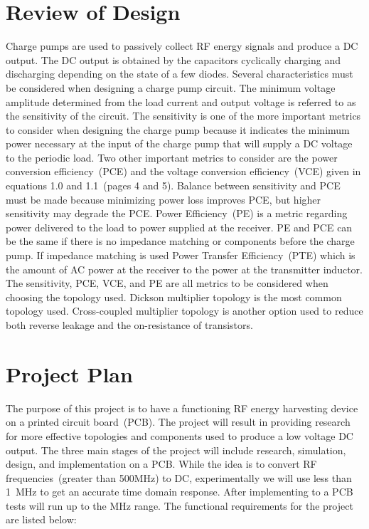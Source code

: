 \documentclass[12pt]{article}
\begin{document}
	\section{Review of Design}
	Charge pumps are used to passively collect RF energy signals and produce a DC output. The DC output is obtained by the capacitors cyclically charging and discharging depending on the state of a few diodes. Several characteristics must be considered when designing a charge pump circuit. The minimum voltage amplitude determined from the load current and output voltage is referred to as the sensitivity of the circuit. The sensitivity is one of the more important metrics to consider when designing the charge pump because it indicates the minimum power necessary at the input of the charge pump that will supply a DC voltage to the periodic load. Two other important metrics to consider are the power conversion efficiency~(PCE) and the voltage conversion efficiency~(VCE) given in equations 1.0 and 1.1~(pages 4 and 5). Balance between sensitivity and PCE must be made because minimizing power loss improves PCE, but higher sensitivity may degrade the PCE.  Power Efficiency~(PE) is a metric regarding power delivered to the load to power supplied at the receiver. PE and PCE can be the same if there is no impedance matching or components before the charge pump.  If impedance matching is used Power Transfer Efficiency~(PTE) which is the amount of AC power at the receiver to the power at the transmitter inductor. The sensitivity, PCE, VCE, and PE are all metrics to be considered when choosing the topology used. Dickson multiplier topology is the most common topology used. Cross-coupled multiplier topology is another option used to reduce both reverse leakage and the on-resistance of transistors.
	
	\section{Project Plan}
	The purpose of this project is to have a functioning RF energy harvesting device on a printed circuit board~(PCB). The project will result in providing research for more effective topologies and components used to produce a low voltage DC output. The three main stages of the project will include research, simulation, design, and implementation on a PCB. While the idea is to convert RF frequencies~(greater than 500MHz) to DC, experimentally we will use less than 1~MHz to get an accurate time domain response. After implementing to a PCB tests will run up to the MHz range. The functional requirements for the project are listed below:\\
	
\end{document}
